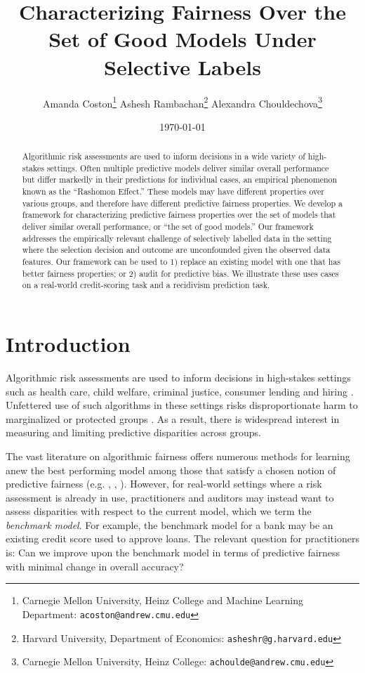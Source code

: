 \documentclass{article}
\title{Characterizing Fairness Over the Set of Good Models Under Selective Labels}
\date{\today}
\author{
    Amanda Coston\thanks{ Carnegie Mellon University, Heinz College and Machine Learning Department: \texttt{acoston@andrew.cmu.edu} }
    \And
    Ashesh Rambachan\thanks{ Harvard University, Department of Economics: \texttt{asheshr@g.harvard.edu} } 
    \And
    Alexandra Chouldechova\thanks{ Carnegie Mellon University, Heinz College: \texttt{achoulde@andrew.cmu.edu} }
}
\begin{document}
\maketitle
\begin{abstract}
Algorithmic risk assessments are used to inform decisions in a wide variety of high-stakes settings. Often multiple predictive models deliver similar overall performance but differ markedly in their predictions for individual cases, an empirical phenomenon known as the ``Rashomon Effect.'' These models may have different properties over various groups, and therefore have different predictive fairness properties. We develop a framework for characterizing predictive fairness properties over the set of models that deliver similar overall performance, or ``the set of good models.'' Our framework addresses the empirically relevant challenge of selectively labelled data in the setting where the selection decision and outcome are unconfounded given the observed data features. Our framework can be used to 1) replace an existing model with one that has better fairness properties; or 2) audit for predictive bias. We illustrate these uses cases on a real-world credit-scoring task and a recidivism prediction task.
\end{abstract}
\section{Introduction} \label{sec:intro}

Algorithmic risk assessments are used to inform decisions in high-stakes settings such as health care, child welfare, criminal justice, consumer lending and hiring \cite{CaruanaEtAl(15), ChouldechovaEtAl(18), kleinberg2018human, FusterEtAl(20), RaghavanEtAl(20)}.
Unfettered use of such algorithms in these settings risks disproportionate harm to marginalized or protected groups \cite{BarocasSelbst2016, dastin_2018, vigdor_2019}. 
As a result, there is widespread interest in measuring and limiting predictive disparities across groups.

The vast literature on algorithmic fairness offers numerous methods for learning anew the best performing model among those that satisfy a chosen notion of predictive fairness (e.g. \cite{ZemelEtAl(13)}, \cite{agarwal2018reductions}, \cite{AgarwalEtAl(19)-FairRegression}). 
However, for real-world settings where a risk assessment is already in use, practitioners and auditors may instead want to assess disparities with respect to the current model, which we term the \textit{benchmark model}. For example, the benchmark model for a bank may be an existing credit score used to approve loans. The relevant question for practitioners is: Can we improve upon the benchmark model in terms of predictive fairness with minimal change in overall accuracy?
\end{document}
